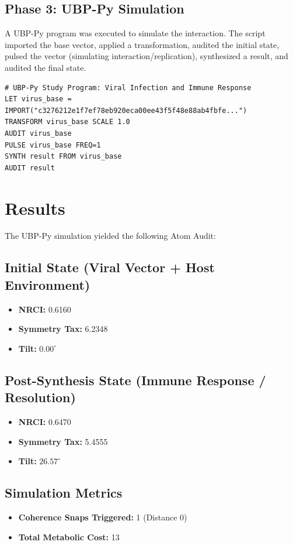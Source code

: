 \documentclass[11pt,a4paper]{article}
\begin{document}
\subsection{Phase 3: UBP-Py Simulation}
A UBP-Py program was executed to simulate the interaction. The script imported the base vector, applied a transformation, audited the initial state, pulsed the vector (simulating interaction/replication), synthesized a result, and audited the final state.

\begin{verbatim}
# UBP-Py Study Program: Viral Infection and Immune Response
LET virus_base = IMPORT("c3276212e1f7ef78eb920eca00ee43f5f48e88ab4fbfe...")
TRANSFORM virus_base SCALE 1.0
AUDIT virus_base
PULSE virus_base FREQ=1
SYNTH result FROM virus_base
AUDIT result
\end{verbatim}

\section{Results}
The UBP-Py simulation yielded the following Atom Audit:

\subsection{Initial State (Viral Vector + Host Environment)}
\begin{itemize}
    \item \textbf{NRCI:} 0.6160
    \item \textbf{Symmetry Tax:} 6.2348
    \item \textbf{Tilt:} $0.00^\circ$
\end{itemize}

\subsection{Post-Synthesis State (Immune Response / Resolution)}
\begin{itemize}
    \item \textbf{NRCI:} 0.6470
    \item \textbf{Symmetry Tax:} 5.4555
    \item \textbf{Tilt:} $26.57^\circ$
\end{itemize}

\subsection{Simulation Metrics}
\begin{itemize}
    \item \textbf{Coherence Snaps Triggered:} 1 (Distance 0)
    \item \textbf{Total Metabolic Cost:} 13
\end{itemize}
\end{document}
